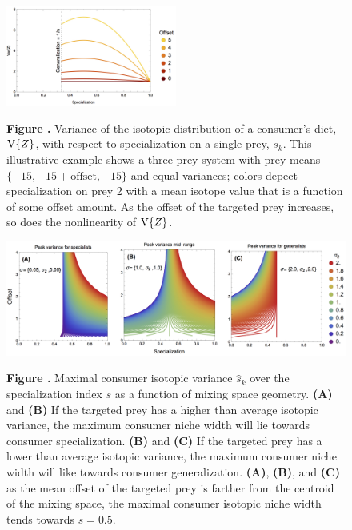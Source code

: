 \documentclass{article}
\begin{document}
\begin{figure}[h!]
\begin{center}
\includegraphics[width=0.5\textwidth]{fig_var.jpg}
\end{center}
\textbf{\label{figvar} Figure .}{
Variance of the isotopic distribution of a consumer's diet, ${\rm V}\{Z\}$, with respect to specialization on a single prey, $s_k$.
This illustrative example shows a three-prey system with prey means $\{-15,-15+\mbox{offset},-15\}$ and equal variances; colors depect specialization on prey 2 with a mean isotope value that is a function of some offset amount.
As the offset of the targeted prey increases, so does the nonlinearity of ${\rm V}\{Z\}$.
}
\end{figure}

\begin{figure}[h!]
\begin{center}
\includegraphics[width=1\textwidth]{fig_specvar.jpg}
\end{center}
\textbf{\label{figspecvar} Figure .}{
Maximal consumer isotopic variance $\hat s_k$ over the specialization index $s$ as a function of mixing space geometry.
{\bf(A)} and {\bf (B)} If the targeted prey has a higher than average isotopic variance, the maximum consumer niche width will lie towards consumer specialization.
{\bf (B)} and {\bf(C)} If the targeted prey has a lower than average isotopic variance, the maximum consumer niche width will like towards consumer generalization.
{\bf(A)}, {\bf (B)}, and {\bf(C)} as the mean offset of the targeted prey is farther from the centroid of the mixing space, the maximal consumer isotopic niche width tends towards $s=0.5$.
}
\end{figure}
\end{document}
